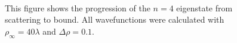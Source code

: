 \documentclass[12pt,twoside]{reedthesis}
\begin{document}
\begin{figure}
\centering {}
 \\ 
\caption[The progression of an eigenstate from scattering to bound]
{This figure shows the progression of the $n = 4$ eigenstate from scattering to bound. All wavefunctions were calculated with $\rho_{\infty} = 40 \lambda$ and $\Delta \rho = 0.1$.} 
\label{fig:scatt-to-bound}
\end{figure}
\end{document}
